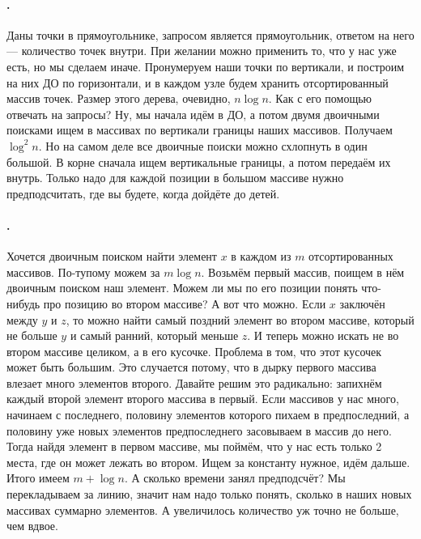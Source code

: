 \documentclass{article}
\begin{document}
    \paragraph{.}
    Даны точки в прямоугольнике, запросом является прямоугольник, ответом на него --- количество точек внутри. При желании можно применить то, что у нас уже есть, но мы сделаем иначе. Пронумеруем наши точки по вертикали, и построим на них ДО по горизонтали, и в каждом узле будем хранить отсортированный массив точек. Размер этого дерева, очевидно, $n\log n$. Как с его помощью отвечать на запросы? Ну, мы начала идём в ДО, а потом двумя двоичными поисками ищем в массивах по вертикали границы наших массивов. Получаем $\log^2n$. Но на самом деле все двоичные поиски можно схлопнуть в один большой. В корне сначала ищем вертикальные границы, а потом передаём их внутрь. Только надо для каждой позиции в большом массиве нужно предподсчитать, где вы будете, когда дойдёте до детей.
    \paragraph{.}
    Хочется двоичным поиском найти элемент $x$ в каждом из $m$ отсортированных массивов. По-тупому можем за $m\log n$. Возьмём первый массив, поищем в нём двоичным поиском наш элемент. Можем ли мы по его позиции понять что-нибудь про позицию во втором массиве? А вот что можно. Если $x$ заключён между $y$ и $z$, то можно найти самый поздний элемент во втором массиве, который не больше $y$ и самый ранний, который меньше $z$. И теперь можно искать не во втором массиве целиком, а в его кусочке. Проблема в том, что этот кусочек может быть большим. Это случается потому, что в дырку первого массива влезает много элементов второго. Давайте решим это радикально: запихнём каждый второй элемент второго массива в первый. Если массивов у нас много, начинаем с последнего, половину элементов которого пихаем в предпоследний, а половину уже новых элементов предпоследнего засовываем в массив до него. Тогда найдя элемент в первом массиве, мы поймём, что у нас есть только 2 места, где он может лежать во втором. Ищем за константу нужное, идём дальше. Итого имеем $m+\log n$. А сколько времени занял предподсчёт? Мы перекладываем за линию, значит нам надо только понять, сколько в наших новых массивах суммарно элементов. А увеличилось количество уж точно не больше, чем вдвое.
\end{document}
